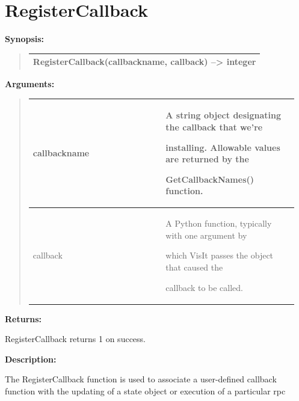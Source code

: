 \documentclass[letterpaper,10pt,english]{sphinxmanual}
\begin{document}
\section{RegisterCallback}
\label{functions:registercallback}
\begin{DUlineblock}{0em}
\item[] \textbf{Synopsis:}
\end{DUlineblock}
\begin{quote}

\begin{tabulary}{\linewidth}{|L|}
\hline

RegisterCallback(callbackname, callback) --\textgreater{} integer
\\
\hline\end{tabulary}

\end{quote}

\begin{DUlineblock}{0em}
\item[] 
\item[] \textbf{Arguments:}
\end{DUlineblock}
\begin{quote}

\begin{tabular}{|p{0.475\linewidth}|p{0.475\linewidth}|}
\hline

callbackname
 & 
\begin{DUlineblock}{0em}
\item[] A string object designating the callback that we're
\item[] installing. Allowable values are returned by the
\item[] GetCallbackNames() function.
\end{DUlineblock}
\\
\hline
callback
 & 
\begin{DUlineblock}{0em}
\item[] A Python function, typically with one argument by
\item[] which VisIt passes the object that caused the
\item[] callback to be called.
\end{DUlineblock}
\\
\hline\end{tabular}

\end{quote}

\begin{DUlineblock}{0em}
\item[] 
\item[] \textbf{Returns:}
\item[] RegisterCallback returns 1 on success.
\item[] 
\item[] \textbf{Description:}
\item[] The RegisterCallback function is used to associate a user-defined callback
function with the updating of a state object or execution of a particular
rpc
\end{DUlineblock}
\end{document}
